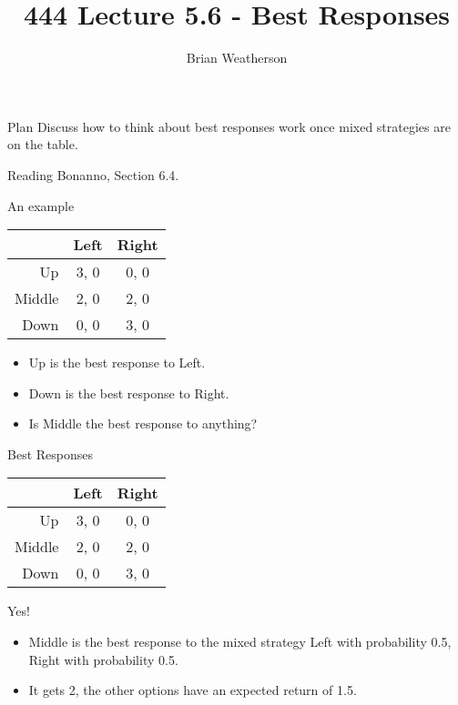 \documentclass[
  ignorenonframetext,
]{beamer}
\title{444 Lecture 5.6 - Best Responses}
\author{Brian Weatherson}
\date{}
\providecommand{\tightlist}{%
  \setlength{\itemsep}{0pt}\setlength{\parskip}{0pt}}
\begin{document}
\frame{\titlepage}

\begin{frame}{Plan}
\protect\hypertarget{plan}{}
Discuss how to think about best responses work once mixed strategies are
on the table.
\end{frame}

\begin{frame}{Reading}
\protect\hypertarget{reading}{}
Bonanno, Section 6.4.
\end{frame}

\begin{frame}{An example}
\protect\hypertarget{an-example}{}
\begin{table}[!h]
\centering
\begin{tabular}[t]{>{}r|cc}
\toprule
 & Left & Right\\
\midrule
Up & 3, 0 & 0, 0\\
Middle & 2, 0 & 2, 0\\
Down & 0, 0 & 3, 0\\
\bottomrule
\end{tabular}
\end{table}

\begin{itemize}
\tightlist
\item
  Up is the best response to Left.
\item
  Down is the best response to Right.
\item
  Is Middle the best response to anything?
\end{itemize}
\end{frame}

\begin{frame}{Best Responses}
\protect\hypertarget{best-responses}{}
\begin{table}[!h]
\centering
\begin{tabular}[t]{>{}r|cc}
\toprule
 & Left & Right\\
\midrule
Up & 3, 0 & 0, 0\\
Middle & 2, 0 & 2, 0\\
Down & 0, 0 & 3, 0\\
\bottomrule
\end{tabular}
\end{table}

Yes!

\begin{itemize}
\tightlist
\item
  Middle is the best response to the mixed strategy Left with
  probability 0.5, Right with probability 0.5.
\item
  It gets 2, the other options have an expected return of 1.5.
\end{itemize}
\end{frame}
\end{document}
